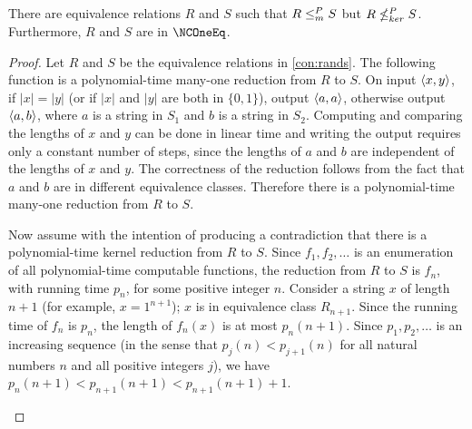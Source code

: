 \begin{theorem}\label{thm:different}
  There are equivalence relations $R$ and $S$ such that $R \leq^{P}_{m} S$ but $R \nleq^{P}_{ker} S$.
  Furthermore, $R$ and $S$ are in $\NCOneEq$.
\end{theorem}
\begin{proof}
  Let $R$ and $S$ be the equivalence relations in \autoref{con:rands}.
  The following function is a polynomial-time many-one reduction from $R$ to $S$.
  On input $\langle x,y\rangle$, if $|x| = |y|$ (or if $|x|$ and $|y|$ are both in $\{0, 1\}$), output $\langle a,a\rangle$, otherwise output $\langle a,b\rangle$, where $a$ is a string in $S_1$ and $b$ is a string in $S_2$.
  Computing and comparing the lengths of $x$ and $y$ can be done in linear time and writing the output requires only a constant number of steps, since the lengths of $a$ and $b$ are independent of the lengths of $x$ and $y$.
  The correctness of the reduction follows from the fact that $a$ and $b$ are in different equivalence classes.
  Therefore there is a polynomial-time many-one reduction from $R$ to $S$.

  Now assume with the intention of producing a contradiction that there is a polynomial-time kernel reduction from $R$ to $S$.
  Since $f_1, f_2, \dotsc$ is an enumeration of all polynomial-time computable functions, the reduction from $R$ to $S$ is $f_n$, with running time $p_n$, for some positive integer $n$.
  Consider a string $x$ of length $n + 1$ (for example, $x = 1^{n + 1}$); $x$ is in equivalence class $R_{n + 1}$.
  Since the running time of $f_n$ is $p_n$, the length of $f_n(x)$ is at most $p_n(n + 1)$.
  Since $p_1, p_2, \dotsc$ is an increasing sequence (in the sense that $p_j(n) < p_{j + 1}(n)$ for all natural numbers $n$ and all positive integers $j$), we have $p_n(n + 1) < p_{n + 1}(n + 1) < p_{n + 1}(n + 1) + 1$.
  \begin{center}
\end{center}
\end{proof}
